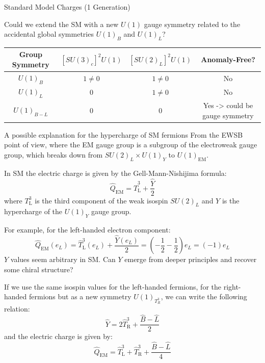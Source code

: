 \documentclass{../bredelebeamer}
\begin{document}
\begin{frame}{Standard Model Charges (1 Generation)}{}
{Could we extend the SM with a new \(U(1)\) gauge symmetry related to the accidental global symmetries \(U(1)_B\) and \(U(1)_L\)?
\begin{table}[h]
\centering
\begin{tabular}{|c|c|c|c|}
\hline
\textbf{Group Symmetry} & \boldmath$[SU(3)_c]^2 U(1)$ & \boldmath$[SU(2)_L]^2 U(1)$ & \textbf{Anomaly-Free?} \bigstrut \\ \hline
\boldmath$U(1)_B$       & $1 \neq 0$                  & $1 \neq 0$                  & No \bigstrut \\ \hline
\boldmath$U(1)_L$       & $0$                         & $1 \neq 0$                  & No \bigstrut \\ \hline
\boldmath$U(1)_{B-L}$   & $0$                         & $0$                         & Yes -> could be gauge symmetry\bigstrut \\ \hline
\end{tabular}
\end{table}

}
\end{frame}
\begin{frame}{A possible explanation for the hypercharge of SM fermions}{}
	From the EWSB point of view, where the EM gauge group is a subgroup of the electroweak gauge group, which breaks down from \(SU(2)_L \times U(1)_Y\) to \(U(1)_{\text{EM}}\).

	In SM the electric charge is given by the Gell-Mann-Nishijima formula:
	\begin{equation}
	\hat Q_{\text{EM}} = \hat T^3_{\text{L}} + \frac{\hat Y}{2}
	\end{equation}
	where $T^3_{\text{L}}$ is the third component of the weak isospin $SU(2)_L$ and $Y$ is the hypercharge of the $U(1)_Y$ gauge group.
	
	For example, for the left-handed electron component:
	\begin{equation}
	\hat Q_{\text{EM}}(e_L) = \hat T^3_{\text{L}}(e_L) + \frac{\hat Y(e_L)}{2} = \left(-\frac{1}{2} - \frac{1}{2}\right) e_L = (-1) e_L
	\end{equation}
	$Y$ values seem arbitrary in SM. Can $Y$ emerge from deeper principles and recover some chiral structure?

	If we use the same isospin values for the left-handed fermions, for the right-handed fermions but as a new symmetry \(U(1)_{T^3_R}\), we can write the following relation:
	\begin{equation}
	\hat Y = 2\hat T^3_{\text{R}} + \frac{\hat B - \hat L}{2}
	\end{equation}
	and the electric charge is given by:
	\begin{equation}
	\hat Q_{\text{EM}} = \hat T^3_{\text{L}} + \hat T^3_{\text{R}} + \frac{\hat B - \hat L}{4}
	\end{equation}
\end{frame}
\end{document}
